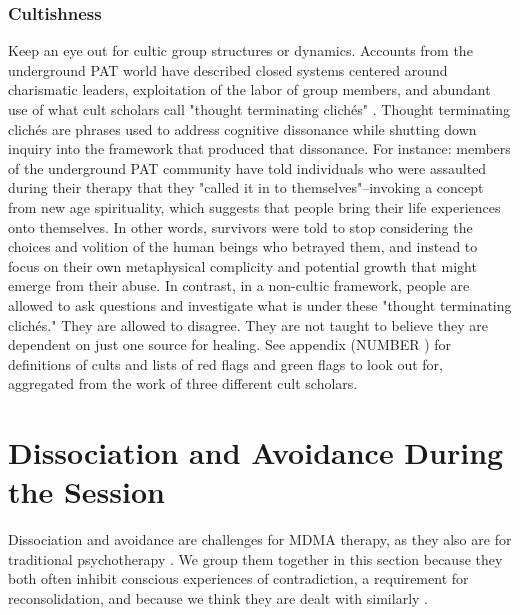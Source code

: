\documentclass[12pt,letterpaper]{book}
\begin{document}
\subsubsection*{Cultishness}
Keep an eye out for cultic group structures or dynamics. Accounts from the underground PAT world have described closed systems centered around charismatic leaders, exploitation of the labor of group members, and abundant use of what cult scholars call "thought terminating clichés" \cite{powerTrip,thoughtTerminating}. Thought terminating clichés are phrases used to address cognitive dissonance while shutting down inquiry into the framework that produced that dissonance. For instance: members of the underground PAT community have told individuals who were assaulted during their therapy that they "called it in to themselves"–invoking a concept from new age spirituality, which suggests that people bring their life experiences onto themselves. In other words, survivors were told to stop considering the choices and volition of the human beings who betrayed them, and instead to focus on their own metaphysical complicity and potential growth that might emerge from their abuse. In contrast, in a non-cultic framework, people are allowed to ask questions and investigate what is under these "thought terminating clichés." They are allowed to disagree. They are not taught to believe they are dependent on just one source for healing. See appendix (NUMBER ) for definitions of cults and lists of red flags and green flags to look out for, aggregated from the work of three different cult scholars. 
\section{Dissociation and Avoidance During the Session}
\label{sec:sessionbarriers}
Dissociation and avoidance are challenges for MDMA therapy, as they also are for traditional psychotherapy \cite{razviPSIP}. We group them together in this section because they both often inhibit conscious experiences of contradiction, a requirement for reconsolidation, and because we think they are dealt with similarly \cite{eckerUnlocking,kozlowskaDefenseCascade}.
\end{document}
